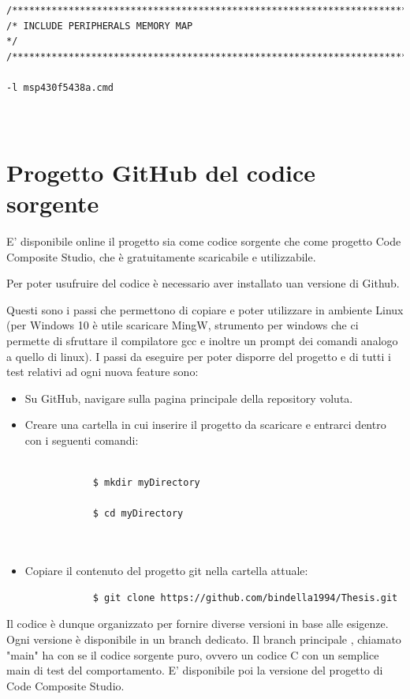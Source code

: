 \documentclass[LaM,binding=0.6cm,oneside]{../sapthesis}
\begin{document}
\begin{lstlisting}
/****************************************************************************/
/* INCLUDE PERIPHERALS MEMORY MAP                                           */
/****************************************************************************/

-l msp430f5438a.cmd

    
\end{lstlisting}

\chapter{Progetto GitHub del codice sorgente}
E' disponibile online il progetto sia come codice sorgente che come progetto Code Composite Studio, che è gratuitamente
scaricabile e utilizzabile.

Per poter usufruire del codice è necessario aver installato uan versione di Github.

Questi sono i passi che permettono di copiare e poter utilizzare in ambiente Linux (per Windows 10 è utile scaricare MingW, strumento per windows che ci permette di sfruttare il compilatore gcc e inoltre un prompt dei comandi analogo a quello di linux).
I passi da eseguire per poter disporre del progetto e di tutti i test relativi ad ogni nuova feature sono:

\begin{itemize}
     \item Su GitHub, navigare sulla pagina principale della repository voluta.
    
    \item Creare una cartella in cui inserire il progetto da scaricare e entrarci dentro con i seguenti comandi:
    \begin{verbatim}

            $ mkdir myDirectory
            
            $ cd myDirectory
      
     
    \end{verbatim}
    \item Copiare il contenuto del progetto git nella cartella attuale:
        \begin{verbatim}
            $ git clone https://github.com/bindella1994/Thesis.git
        \end{verbatim}
\end{itemize}

Il codice è dunque organizzato per fornire diverse versioni in base alle esigenze.
Ogni versione è disponibile in un branch dedicato. Il branch principale , chiamato "main" ha con se il codice sorgente puro, ovvero un codice C con un semplice main di test del comportamento.
E' disponibile poi la versione del progetto di Code Composite Studio.
\end{document}
